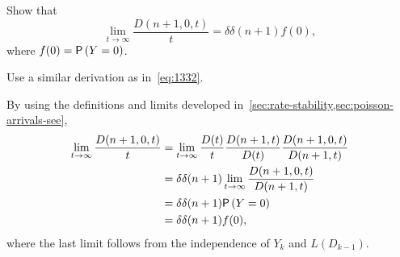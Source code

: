 \begin{exercise}
Show that 
\begin{equation*}
  \lim_{t\to\infty} \frac{  D(n+1, 0, t)}t  = \delta \delta(n+1) f(0),
\end{equation*}
where $f(0)=\P{Y=0}$.
\begin{hint}
Use a similar derivation as in~\cref{eq:1332}.
\end{hint}
\begin{solution}
By using the definitions and limits developed in~\cref{sec:rate-stability,sec:poisson-arrivals-see},
\begin{align*}
  \lim_{t\to\infty} \frac{  D(n+1, 0, t)}t 
&=   \lim_{t\to\infty}  \frac{D(t)}t \frac{D(n+1, t)}{D(t)}\frac{ D(n+1, 0, t)}{D(n+1,t)} \\
&=   \delta \delta(n+1) \lim_{t\to\infty} \frac{ D(n+1, 0, t)}{D(n+1,t)} \\
&=   \delta \delta(n+1) \P{Y=0}\\
& = \delta \delta(n+1) f(0),
\end{align*}
where the last limit follows from the independence of $Y_k$ and
$L(D_{k-1})$. 
\end{solution}
\end{exercise}

